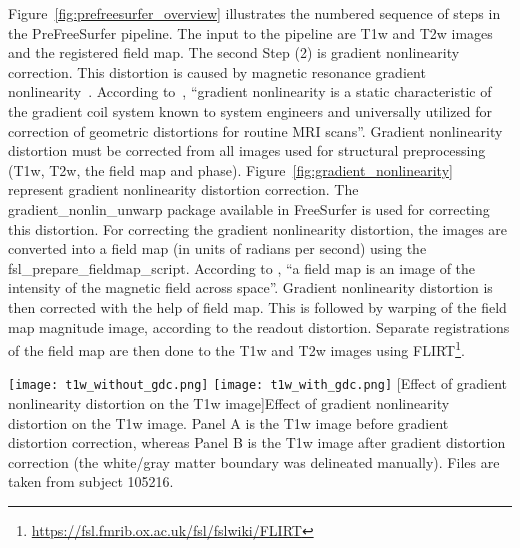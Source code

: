 \indent Figure~\ref{fig:prefreesurfer_overview} illustrates the 
numbered sequence of steps in the PreFreeSurfer pipeline. The input to 
the pipeline are T1w and T2w images and the registered field map. 
The second Step (2) is gradient nonlinearity correction. This distortion is 
caused by magnetic resonance gradient nonlinearity~\cite{Gla13}. 
According to~\cite{Zou2004}, ``gradient nonlinearity is a static 
characteristic of the gradient coil system known to system engineers 
and universally utilized for correction of geometric distortions for 
routine MRI scans''. Gradient nonlinearity distortion must be corrected 
from all images used for structural preprocessing (T1w, T2w, the field 
map and phase). Figure~\ref{fig:gradient_nonlinearity} represent 
gradient nonlinearity distortion correction. The gradient\_nonlin\_unwarp 
package available in FreeSurfer is used for correcting this distortion. 
For correcting the gradient nonlinearity distortion, the images are 
converted into a field map (in units of radians per second) using the 
fsl\_prepare\_fieldmap\_script. According to \cite{field_map}, ``a 
field map is an image of the intensity of the magnetic field across 
space''. Gradient nonlinearity distortion is then corrected with the 
help of field map. This is followed by warping of the field map 
magnitude image, according to the readout distortion. Separate 
registrations of the field map are then done to the T1w and T2w images 
using FLIRT\footnote{\url{https://fsl.fmrib.ox.ac.uk/fsl/fslwiki/FLIRT}}.

\begin{center}
  \texttt{[image: t1w\_without\_gdc.png]}%
  \texttt{[image: t1w\_with\_gdc.png]}
  [Effect of gradient nonlinearity distortion on the T1w image]{Effect of gradient nonlinearity distortion on the T1w image. Panel A is the T1w image before gradient distortion correction, whereas Panel B is the T1w image after gradient distortion correction (the white/gray matter boundary was delineated manually). Files are taken from subject 105216.}
  \label{fig:gradient_nonlinearity}
\end{center}


